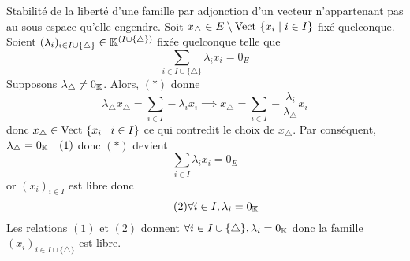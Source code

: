 \documentclass{article}
\renewenvironment{question_kholle}[2][ ]
{
	\subsection{\texorpdfstring{#2}{}}
	\notblank{#1}
	{
		\noindent #1
		\bigbreak
	}
	{}
	\begin{proof}
}
{
	\end{proof}
}
\begin{document}
\begin{question_kholle}{Stabilité de la liberté d’une famille par adjonction d’un vecteur n’appartenant pas au sous-espace qu’elle engendre.}
	Soit $x_{\triangle}\in E\setminus \text{Vect } \{x_{i} \mid i\in I\}$ fixé quelconque. Soient $(\lambda_{i})_{i\in I\cup\{\triangle\}}\in\mathbb K^{(I\cup \{\triangle\})}$ fixée quelconque telle que
	\begin{equation}\tag{$*$}
		\sum_{i\in I\cup\{\triangle\}}\lambda_{i} x_{i} = 0_{E}
	\end{equation}
	Supposons $\lambda_{\triangle}\neq 0_{\mathbb K}$. Alors, $(*)$ donne
	\[
		\lambda_{\triangle}x_{\triangle} = \sum_{i\in I}-\lambda_{i}x_{i} \implies x_{\triangle}=\sum_{i\in I}-\frac{\lambda_{i}}{\lambda_{\triangle}}x_{i}
	\]
	donc $x_{\triangle}\in\text{Vect }\{x_{i} \mid i\in I\}$ ce qui contredit le choix de $x_{\triangle}$. Par conséquent, $\lambda_{\triangle}=0_{\mathbb K}\quad (1)$ donc $(*)$ devient
	\[
		\sum_{i\in I}\lambda_{i} x_{i} = 0_{E}
	\]
	or $(x_{i})_{i\in I}$ est libre donc
	\begin{equation}\tag{$2$}
		\forall i\in I, \lambda_{i} = 0_{\mathbb K}
	\end{equation}
	Les relations $(1)$ et $(2)$ donnent $\forall i\in I\cup \{\triangle\}, \lambda_{i} = 0_{\mathbb K}$ donc la famille $(x_{i})_{i\in I\cup \{\triangle\}}$ est libre.
\end{question_kholle}
\end{document}

